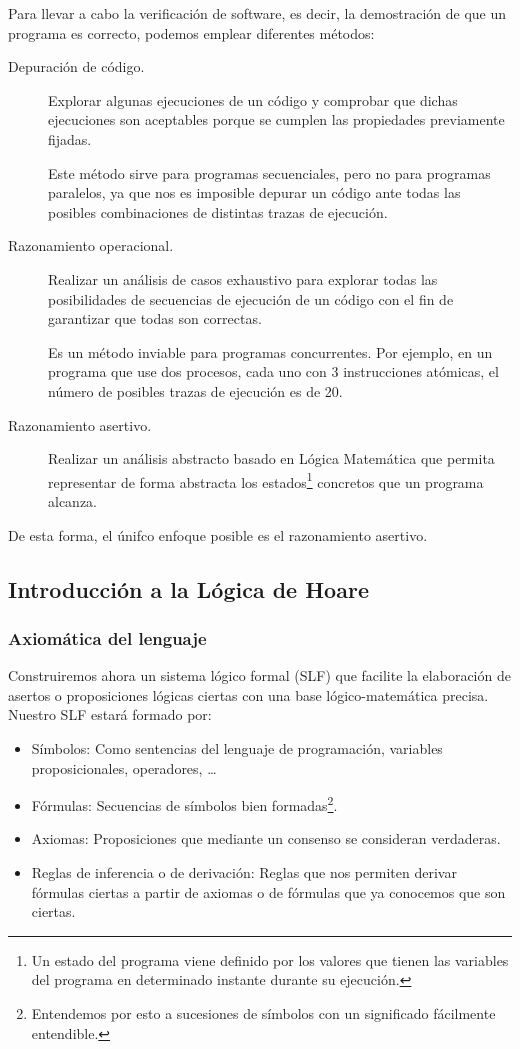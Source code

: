 Para llevar a cabo la verificación de software, es decir, la demostración de que un programa es correcto, podemos emplear diferentes métodos:
\begin{description}
    \item [Depuración de código.] Explorar algunas ejecuciones de un código y comprobar que dichas ejecuciones son aceptables porque se cumplen las propiedades previamente fijadas.

        Este método sirve para programas secuenciales, pero no para programas paralelos, ya que nos es imposible depurar un código ante todas las posibles combinaciones de distintas trazas de ejecución.
    \item [Razonamiento operacional.] Realizar un análisis de casos exhaustivo para explorar todas las posibilidades de secuencias de ejecución de un código con el fin de garantizar que todas son correctas.

        Es un método inviable para programas concurrentes. Por ejemplo, en un programa que use dos procesos, cada uno con 3 instrucciones atómicas, el número de posibles trazas de ejecución es de 20.
    \item [Razonamiento asertivo.] Realizar un análisis abstracto basado en Lógica Matemática que permita representar de forma abstracta los estados\footnote{Un estado del programa viene definido por los valores que tienen las variables del programa en determinado instante durante su ejecución.} concretos que un programa alcanza.
\end{description}
De esta forma, el únifco enfoque posible es el razonamiento asertivo.

\subsection{Introducción a la Lógica de Hoare}
\subsubsection{Axiomática del lenguaje}
Construiremos ahora un sistema lógico formal (SLF) que facilite la elaboración de asertos o proposiciones lógicas ciertas con una base lógico-matemática precisa.\\

Nuestro SLF estará formado por:
\begin{itemize}
    \item Símbolos: Como sentencias del lenguaje de programación, variables proposicionales, operadores, \ldots
    \item Fórmulas: Secuencias de símbolos bien formadas\footnote{Entendemos por esto a sucesiones de símbolos con un significado fácilmente entendible.}.
    \item Axiomas: Proposiciones que mediante un consenso se consideran verdaderas.
    \item Reglas de inferencia o de derivación: Reglas que nos permiten derivar fórmulas ciertas a partir de axiomas o de fórmulas que ya conocemos que son ciertas.
\end{itemize}

